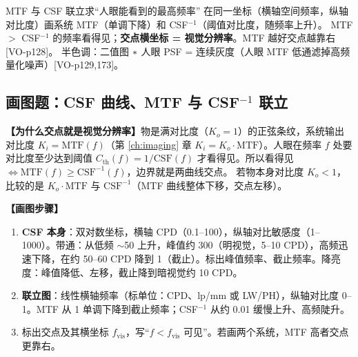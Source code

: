 \begin{recipe}{MTF 与 CSF 联立求“人眼能看到的最高频率”}
在同一坐标（横轴空间频率，纵轴对比度）画系统 MTF（单调下降）和 CSF$^{-1}$（阈值对比度，随频率上升）。
MTF $>$ CSF$^{-1}$ 的频率看得见；\textbf{交点横坐标 = 视觉分辨率}。MTF 越好交点越靠右 [VO-p128]。
半色调：二值图 $\ast$ 人眼 PSF = 连续灰度（人眼 MTF 低通滤掉高频量化噪声）[VO-p129,173]。
\end{recipe}

\subsection{画图题：CSF 曲线、MTF 与 CSF$^{-1}$ 联立}\label{sec:mtfcsf}
\textbf{【为什么交点就是视觉分辨率】}物是满对比度（$K_o=1$）的正弦条纹，系统输出对比度 $K_i=\mathrm{MTF}(f)$（第 \ref{ch:imaging} 章 $K_i=K_o\cdot\mathrm{MTF}$）。人眼在频率 $f$ 处要对比度至少达到阈值 $C_{\text{th}}(f)=1/\mathrm{CSF}(f)$ 才看得见。所以看得见 $\Leftrightarrow\mathrm{MTF}(f)\ge\mathrm{CSF}^{-1}(f)$，边界就是两曲线交点。
若物本身对比度 $K_o<1$，比较的是 $K_o\cdot\mathrm{MTF}$ 与 $\mathrm{CSF}^{-1}$（MTF 曲线整体下移，交点左移）。

\textbf{【画图步骤】}
\begin{enumerate}
\item \textbf{CSF 本身}：双对数坐标，横轴 CPD（0.1–100），纵轴对比敏感度（1–1000）。带通：从低频 $\sim$50 上升，峰值约 300（明视觉，5–10 CPD），高频迅速下降，在约 50–60 CPD 降到 1（截止）。标出峰值频率、截止频率。降亮度：峰值降低、左移，截止降到暗视觉约 10 CPD。
\item \textbf{联立图}：线性横轴频率（标单位：CPD、lp/mm 或 LW/PH），纵轴对比度 0–1。MTF 从 1 单调下降到截止频率；CSF$^{-1}$ 从约 0.01 缓慢上升、高频陡升。
\item 标出交点及其横坐标 $f_{\text{vis}}$，写“$f<f_{\text{vis}}$ 可见”。若画两个系统，MTF 高者交点更靠右。
\end{enumerate}

